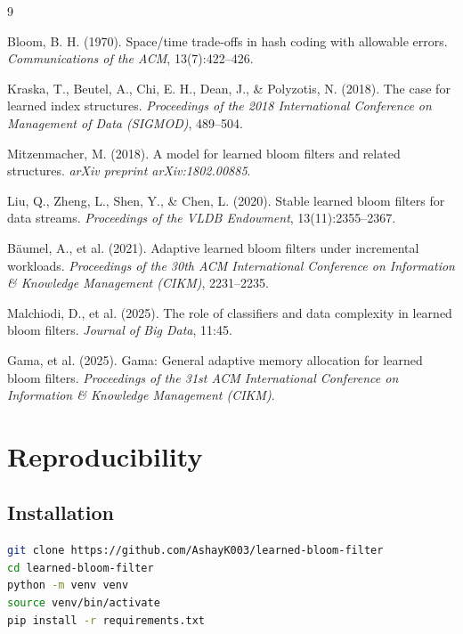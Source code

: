 \documentclass[11pt,a4paper]{article}
\begin{document}
\begin{thebibliography}{9}

Bloom, B. H. (1970).
\newblock Space/time trade-offs in hash coding with allowable errors.
\newblock \textit{Communications of the ACM}, 13(7):422--426.

Kraska, T., Beutel, A., Chi, E. H., Dean, J., \& Polyzotis, N. (2018).
\newblock The case for learned index structures.
\newblock \textit{Proceedings of the 2018 International Conference on Management of Data (SIGMOD)}, 489--504.

Mitzenmacher, M. (2018).
\newblock A model for learned bloom filters and related structures.
\newblock \textit{arXiv preprint arXiv:1802.00885}.

Liu, Q., Zheng, L., Shen, Y., \& Chen, L. (2020).
\newblock Stable learned bloom filters for data streams.
\newblock \textit{Proceedings of the VLDB Endowment}, 13(11):2355--2367.

B\"aumel, A., et al. (2021).
\newblock Adaptive learned bloom filters under incremental workloads.
\newblock \textit{Proceedings of the 30th ACM International Conference on Information \& Knowledge Management (CIKM)}, 2231--2235.

Malchiodi, D., et al. (2025).
\newblock The role of classifiers and data complexity in learned bloom filters.
\newblock \textit{Journal of Big Data}, 11:45.

Gama, et al. (2025).
\newblock Gama: General adaptive memory allocation for learned bloom filters.
\newblock \textit{Proceedings of the 31st ACM International Conference on Information \& Knowledge Management (CIKM)}.

\end{thebibliography}

\appendix
\section{Reproducibility}

\subsection{Installation}

\begin{lstlisting}[language=bash]
git clone https://github.com/AshayK003/learned-bloom-filter
cd learned-bloom-filter
python -m venv venv
source venv/bin/activate
pip install -r requirements.txt
\end{lstlisting}
\end{document}

